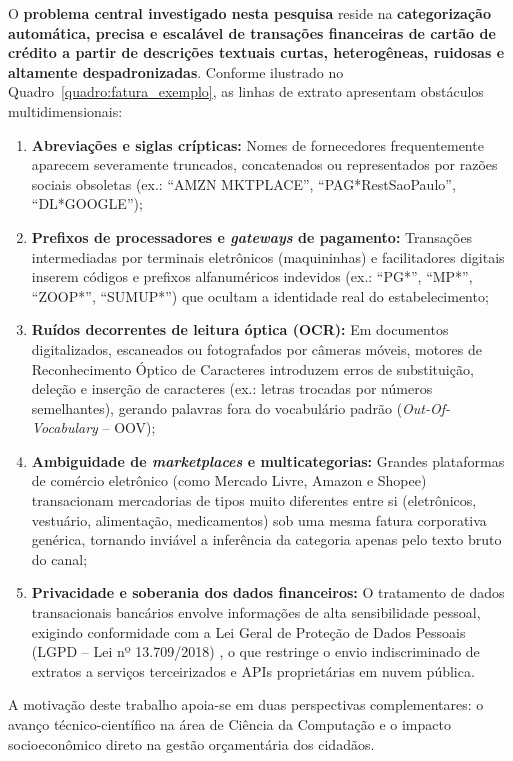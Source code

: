 O \textbf{problema central investigado nesta pesquisa} reside na \textbf{categorização automática, precisa e escalável de transações financeiras de cartão de crédito a partir de descrições textuais curtas, heterogêneas, ruidosas e altamente despadronizadas}. Conforme ilustrado no Quadro~\ref{quadro:fatura_exemplo}, as linhas de extrato apresentam obstáculos multidimensionais:
\begin{enumerate}
	\item \textbf{Abreviações e siglas crípticas:} Nomes de fornecedores frequentemente aparecem severamente truncados, concatenados ou representados por razões sociais obsoletas (ex.: ``AMZN MKTPLACE'', ``PAG*RestSaoPaulo'', ``DL*GOOGLE'');
	\item \textbf{Prefixos de processadores e \textit{gateways} de pagamento:} Transações intermediadas por terminais eletrônicos (maquininhas) e facilitadores digitais inserem códigos e prefixos alfanuméricos indevidos (ex.: ``PG*'', ``MP*'', ``ZOOP*'', ``SUMUP*'') que ocultam a identidade real do estabelecimento;
	\item \textbf{Ruídos decorrentes de leitura óptica (OCR):} Em documentos digitalizados, escaneados ou fotografados por câmeras móveis, motores de Reconhecimento Óptico de Caracteres introduzem erros de substituição, deleção e inserção de caracteres (ex.: letras trocadas por números semelhantes), gerando palavras fora do vocabulário padrão (\textit{Out-Of-Vocabulary} -- OOV);
	\item \textbf{Ambiguidade de \textit{marketplaces} e multicategorias:} Grandes plataformas de comércio eletrônico (como Mercado Livre, Amazon e Shopee) transacionam mercadorias de tipos muito diferentes entre si (eletrônicos, vestuário, alimentação, medicamentos) sob uma mesma fatura corporativa genérica, tornando inviável a inferência da categoria apenas pelo texto bruto do canal;
	\item \textbf{Privacidade e soberania dos dados financeiros:} O tratamento de dados transacionais bancários envolve informações de alta sensibilidade pessoal, exigindo conformidade com a Lei Geral de Proteção de Dados Pessoais (LGPD -- Lei nº 13.709/2018) \cite{brasil2018lgpd}, o que restringe o envio indiscriminado de extratos a serviços terceirizados e APIs proprietárias em nuvem pública.
\end{enumerate}

A motivação deste trabalho apoia-se em duas perspectivas complementares: o avanço técnico-científico na área de Ciência da Computação e o impacto socioeconômico direto na gestão orçamentária dos cidadãos.

